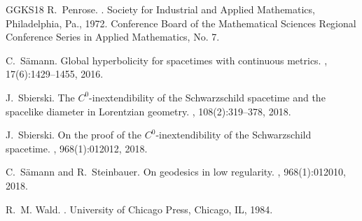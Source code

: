 \documentclass[reqno]{amsart}
\numberwithin{equation}{section}
\theoremstyle{plain}
\theoremstyle{definition}
\theoremstyle{remark}
\begin{document}
\begin{thebibliography}{GGKS18}
R.~Penrose.
.
\newblock Society for Industrial and Applied Mathematics, Philadelphia, Pa.,
  1972.
\newblock Conference Board of the Mathematical Sciences Regional Conference
  Series in Applied Mathematics, No. 7.

C.~S{\"a}mann.
\newblock Global hyperbolicity for spacetimes with continuous metrics.
, 17(6):1429--1455, 2016.

J.~Sbierski.
\newblock The {$C^0$}-inextendibility of the {S}chwarzschild spacetime and the
  spacelike diameter in {L}orentzian geometry.
, 108(2):319--378, 2018.

J.~Sbierski.
\newblock On the proof of the {$C^0$}-inextendibility of the {S}chwarzschild
  spacetime.
, 968(1):012012, 2018.

C.~S\"{a}mann and R.~Steinbauer.
\newblock On geodesics in low regularity.
, 968(1):012010, 2018.

R.~M. Wald.
.
\newblock University of Chicago Press, Chicago, IL, 1984.

\end{thebibliography}
\end{document}
